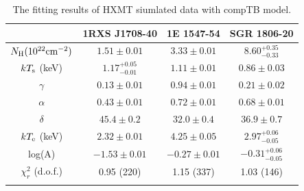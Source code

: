 \documentclass[]{raa}
\begin{document}
\begin{table}
\bc
\begin{minipage}[]{100mm}
\caption[]{The fitting results of HXMT siumlated data with compTB model. 
\label{fit_h}}
\end{minipage}
 \begin{tabular}{cccc}
  \hline\noalign{\smallskip}
 & 1RXS J1708-40 & 1E 1547-54 & SGR 1806-20 \\
  \hline\noalign{\smallskip}
$N_{\rm H} (10^{22} {\rm cm}^{-2})$ & $1.51 \pm 0.01 $ & $3.33 \pm 0.01$ & $8.60_{-0.33}^{+0.35}$\\
$kT_{\rm s}$ (keV) & $1.17_{-0.01}^{+0.05}$ & $1.11 \pm 0.01 $ & $0.86 \pm 0.03$ \\ %
$\gamma$ & $0.13 \pm 0.01 $ & $0.94 \pm 0.01$ & $0.21 \pm 0.02$ \\ %
$\alpha$ & $0.43 \pm 0.01$ & $0.72 \pm 0.01$ & $0.68 \pm 0.01 $ \\%
$\delta$ & $45.4 \pm 0.2$ & $32.0 \pm 0.4$ & $36.9 \pm 0.7$ \\%
$kT_{\rm e}$ (keV) & $2.32 \pm 0.01$ & $4.25 \pm 0.05$ & $2.97_{-0.05}^{+0.06}$ \\ %
log(A) & $-1.53 \pm 0.01 $ & $-0.27 \pm 0.01$ & $-0.31_{-0.05}^{+0.06}$ \\ %
$\chi_r^2$ (d.o.f.) & 0.95 (220) & 1.15 (337) & 1.03 (146) \\ %
  \noalign{\smallskip}\hline
\end{tabular}
\ec
\end{table}
\end{document}

